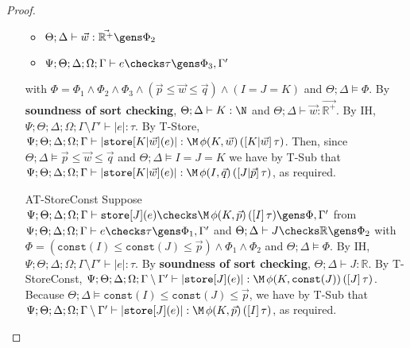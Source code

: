 \begin{proof}
\begin{enumerate}
\begin{itemize}
    \item $\Theta ; \Delta \vdash \vec{w} : \vec{\mathbb{R}^+} \gens \Phi_2$
    \item $\Psi ; \Theta ; \Delta ; \Omega ; \Gamma \vdash e \checks \tau \gens \Phi_3,\Gamma'$
  \end{itemize}
  with $\Phi =  \Phi_1 \wedge \Phi_2 \wedge\Phi_3 \wedge  (\vec{p} \leq \vec{w} \leq \vec{q}) \wedge (I = J = K)$
  and $\Theta ; \Delta \vDash \Phi$. By \textbf{soundness of sort checking}, $\Theta ; \Delta \vdash K : \N$ and $\Theta ; \Delta \vdash \vec{w} : \vec{\mathbb{R}^+}$. By IH, $\Psi ; \Theta ; \Delta ; \Omega ; \Gamma \setminus \Gamma' \vdash |e| : \tau$. By T-Store,
   $\Psi ; \Theta ; \Delta ; \Omega ; \Gamma \vdash |\texttt{store}[K|\vec{w}](e)| : \M \, \phi(K,\vec{w}) \, ([K | \vec{w}] \, \tau)$. Then, since $\Theta ; \Delta \vDash \vec{p} \leq \vec{w} \leq \vec{q}$ and $\Theta ; \Delta \vDash I = J = K$ we have by T-Sub that $\Psi ; \Theta ; \Delta ; \Omega ; \Gamma \vdash |\texttt{store}[K|\vec{w}](e)| : \M \, \phi(I,\vec{q}) \, ([J | \vec{p}] \, \tau)$, as required.
  
  \item[AT-StoreConst] Suppose $\Psi ; \Theta ; \Delta ; \Omega ; \Gamma \vdash \texttt{store}[J](e) \checks \M \, \phi(K,\vec{p}) \, ([I] \, \tau) \gens \Phi, \Gamma'$ from $\Psi ; \Theta ; \Delta ; \Omega ; \Gamma \vdash e \checks \tau \gens \Phi_1,\Gamma'$ and
 $\Theta ; \Delta \vdash J \checks \mathbb{R} \gens \Phi_2$ 
 with $\Phi = (\texttt{const}(I) \leq \texttt{const}(J) \leq \vec{p}) \wedge \Phi_1 \wedge \Phi_2$ 
 and $\Theta ; \Delta \vDash \Phi$. 
 By IH, $\Psi ; \Theta ; \Delta ; \Omega ; \Gamma \setminus \Gamma' \vdash |e| : \tau$.  By \textbf{soundness of sort checking}, $\Theta ; \Delta \vdash J : \mathbb{R}$. By T-StoreConst, $\Psi ; \Theta ; \Delta ; \Omega ; \Gamma \setminus \Gamma' \vdash |\texttt{store}[J](e)| : \M \, \phi(K,\texttt{const}(J)) \, ([J] \, \tau)$. Because $\Theta ; \Delta \vDash \texttt{const}(I) \leq \texttt{const}(J) \leq \vec{p}$, we have by T-Sub that
 $\Psi ; \Theta ; \Delta ; \Omega ; \Gamma \setminus \Gamma' \vdash |\texttt{store}[J](e)| : \M \, \phi(K,\vec{p}) \, ([I] \, \tau)$, as required.
  

\end{enumerate}
\end{proof}
